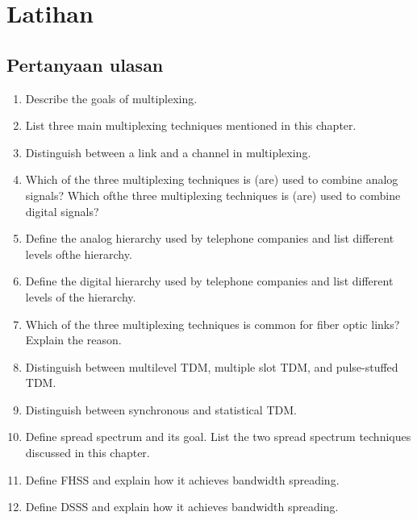 \section{Latihan}

\subsection*{Pertanyaan ulasan}

\begin{enumerate}
  \item Describe the goals of multiplexing.
  \item List three main multiplexing techniques mentioned in this chapter. 
  \item Distinguish between a link and a channel in multiplexing. 
  \item Which of the three multiplexing techniques is (are) used to combine analog signals? Which ofthe three multiplexing techniques is (are) used to combine digital signals? 
  \item Define the analog hierarchy used by telephone companies and list different levels ofthe hierarchy. 
  \item Define the digital hierarchy used by telephone companies and list different levels of the hierarchy. 
  \item Which of the three multiplexing techniques is common for fiber optic links? Explain the reason. 
  \item Distinguish between multilevel TDM, multiple slot TDM, and pulse-stuffed TDM. 
  \item Distinguish between synchronous and statistical TDM. 
  \item Define spread spectrum and its goal. List the two spread spectrum techniques discussed in this chapter. 
  \item Define FHSS and explain how it achieves bandwidth spreading. 
  \item Define DSSS and explain how it achieves bandwidth spreading.
\end{enumerate}

